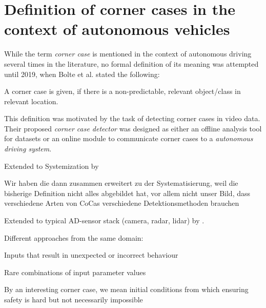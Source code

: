 \section{Definition of corner cases in the context of autonomous vehicles}


While the term \emph{corner case} is mentioned in the context of autonomous driving several times in the literature, no formal definition of its meaning was attempted until 2019, when Bolte et al. stated the following:

\begin{displayquote}
A corner case is given, if there is a non-predictable, 
relevant object/class in relevant location.
\end{displayquote}

This definition was motivated by the task of detecting corner cases in video data. Their proposed \emph{corner case detector} was designed as either an offline analysis tool for datasets or an online module to communicate corner cases to a \emph{autonomous driving system}.

Extended to Systemization by \cite{breitenstein_corner_2020, breitenstein_systematization_2020}

\begin{displayquote}
Wir haben die dann zusammen erweitert zu der Systematisierung, weil die bisherige Definition nicht alles abgebildet hat, vor allem nicht unser Bild, dass verschiedene Arten von CoCas verschiedene Detektionsmethoden brauchen
\end{displayquote}

Extended to typical AD-sensor stack (camera, radar, lidar) by \cite{heidecker_application-driven_2021}.

Different approaches from the same domain:

\begin{displayquote}
Inputs that result in unexpected or incorrect behaviour \end{displayquote}

\begin{displayquote}
Rare combinations of input parameter values \end{displayquote}

\begin{displayquote}
By an interesting corner case, we mean
initial conditions from which ensuring safety is hard but not
necessarily impossible 
\end{displayquote}

